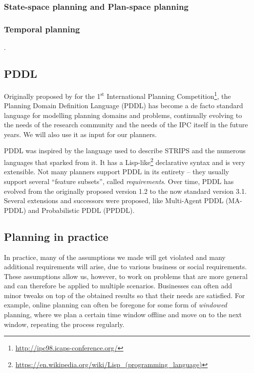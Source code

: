 \subsubsection{State-space planning and Plan-space planning}


\subsubsection{Temporal planning}

.

\subsection{PDDL}\label{pddl}

Originally proposed by \citet{McDermott1998} for the 1$^{\mathrm{st}}$ International Planning
Competition\footnote{\url{http://ipc98.icaps-conference.org/}},
the Planning Domain Definition Language (PDDL) has become
a de facto standard language for modelling planning domains and problems,
continually evolving to the needs of the  
research community and the needs of the IPC itself in the future years.
We will also use it as input for our planners.

PDDL was inspired by the language used to describe STRIPS \citep{Fikes1971}
and the numerous languages that sparked from it.
It has a Lisp-like\footnote{\url{https://en.wikipedia.org/wiki/Lisp_(programming_language)}}
declarative syntax and is very extensible.
Not many planners support PDDL in its entirety -- they usually support 
several ``feature subsets'', called \textit{requirements}.
Over time, PDDL has evolved from the originally proposed version 1.2
to the now standard version 3.1. Several extensions and successors were proposed,
like Multi-Agent PDDL
(MA-PDDL) and
Probabilistic PDDL
(PPDDL).

\subsection{Planning in practice}

In practice, many of the assumptions we made will get violated and many additional requirements will arise,
due to various business or social requirements.
These assumptions allow us, however, to work
on problems that are more general and can therefore be applied to multiple scenarios.
Businesses can often add minor tweaks on top of the obtained results so that
their needs are satisfied. 
For example, online planning can often be foregone for some form of \textit{windowed} planning,
where we plan a certain time window offline and move on to the next window,
repeating the process regularly.

